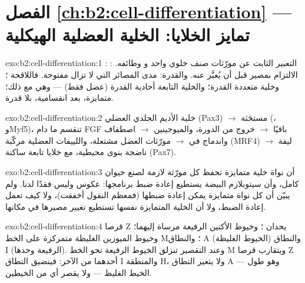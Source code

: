 \section*{الفصل \ref{ch:b2:cell-differentiation} --- تمايز الخلايا: الخلية العضلية الهيكلية}

\begin{solution}{exo:b2:cell-differentiation:1}
: التعبير الثابت عن مورّثات صنف خلوي واحد و
وظائفه. : الالتزام بمصير قبل أن
يُعبَّر عنه. والقدرة: مدى المصائر التي لا تزال مفتوحة. فاللاقحة
؛ وخلية  متعددة القدرة؛ والخلية التابعة
أحادية القدرة (عضل فقط) --- وهي  مع ذلك؛ 
متمايزة، بعد انقسامية، بلا قدرة.
\end{solution}

\begin{solution}{exo:b2:cell-differentiation:2}
خلية الأديم الجلدي العضلي (Pax3) $\to$  مستحَثة (، وMyf5)،
تنقسم ما دام FGF باقيًا $\to$ خروج من الدورة، والميوجينين $\to$ اصطفاف
واندماج في  $\to$ مورّثات العضل مشتعلة، واللييفات العضلية
مركّبة (MRF4) $\to$ ليفة ناضجة بنوى محيطية، مع
خلايا تابعة ساكنة (Pax7).
\end{solution}

\begin{solution}{exo:b2:cell-differentiation:3}
أن نواة خلية متمايزة تحفظ كل مورّثة لازمة
لصنع حيوان كامل، وأن سيتوبلازم البيضة يستطيع إعادة ضبط
برنامجها:  عكوس وليس فقدًا لدنا. ولم
يبيّن أن كل نواة متمايزة يمكن إعادة ضبطها (فمعظم
النقول أخفقت)، ولا كيف تعمل إعادة الضبط، ولا أن الخلية
المتمايزة نفسها تستطيع تغيير مصيرها في مكانها.
\end{solution}

\begin{solution}{exo:b2:cell-differentiation:4}
قرصا Z يحدان ؛ وخيوط الأكتين الرفيعة مرساة
إليهما؛ وخيوط الميوزين الغليظة متمركزة على الخط M؛ والنطاق A
(الخيوط الغليظة) والنطاق I (الرفيعة وحدها). وعند التقصير تنزلق الخيوط
الرفيعة نحو الخط M ويتقارب قرصا Z أحدهما من
الآخر: فينضيق النطاق I والمنطقة H، ولا يتغير النطاق A --- وهو طول
الخيط الغليظ --- ولا يقصر أي من الخيطين.
\end{solution}

